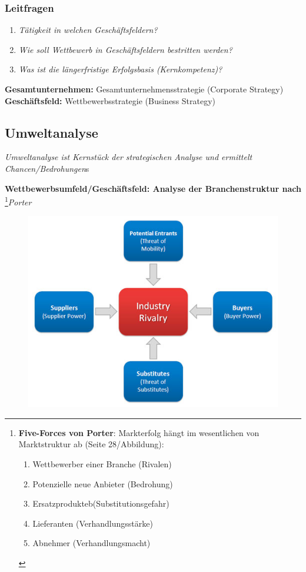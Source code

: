 \documentclass[a4paper,11pt, twoside]{article}
\begin{document}
\subsubsection*{Leitfragen}
\begin{enumerate}
	\item \textit{Tätigkeit in welchen Geschäftsfeldern?}
	\item \textit{Wie soll Wettbewerb in Geschäftsfeldern bestritten werden?}
	\item \textit{Was ist die längerfristige Erfolgsbasis (Kernkompetenz)?}
\end{enumerate}

\textbf{Gesamtunternehmen:} Gesamtunternehmensstrategie (Corporate Strategy)\\
\textbf{Geschäftsfeld:} Wettbewerbsstrategie (Business Strategy)

\subsection{Umweltanalyse}
\textit{Umweltanalyse ist Kernstück der strategischen Analyse und ermittelt Chancen/Bedrohungen}s

\textbf{Wettbewerbsumfeld/Geschäftsfeld: Analyse der Branchenstruktur nach} \footnote{
\textbf{Five-Forces von Porter}: Markterfolg hängt im wesentlichen von Marktstruktur ab (Seite 28/Abbildung):
\begin{enumerate}
	\item Wettbewerber einer Branche (Rivalen)
	\item Potenzielle neue Anbieter (Bedrohung)
	\item Ersatzprodukteb(Substitutionsgefahr)
	\item Lieferanten (Verhandlungsstärke)
	\item Abnehmer (Verhandlungsmacht)
\end{enumerate}
}{\textit{Porter}}

\begin{figure}[h]
 \begin{center}
   \includegraphics[scale=0.4]{bilder/pffmodel.jpg}
 \end{center}
\end{figure}
\newpage
\end{document}
